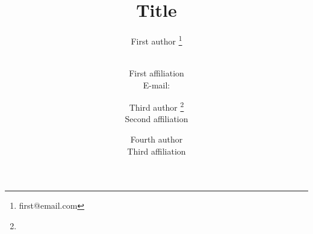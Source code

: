 \documentclass{PoS}
\title{Title}
\author{First author \thanks{first@email.com}}
\author{
\speaker{Second author is speaker}\\
First affiliation\\
E-mail: \email{second@email.com}
}
\author{Third author \thanks{\email{third@email.com}}\\Second affiliation}
\author{Fourth author\\Third affiliation}
\begin{document}
\Blinddocument
\end{document}

